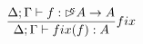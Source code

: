 \[
\frac { \Delta;\Gamma \vdash f : \rhd^{\!\!\!\kappa} A \rightarrow A }{ \Delta;\Gamma \vdash fix(f): A } fix
\]

